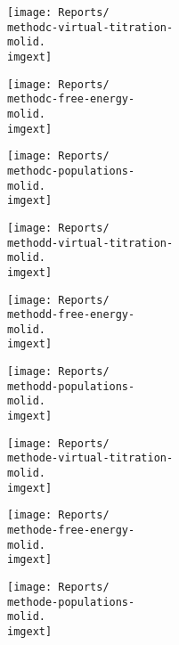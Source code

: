 \documentclass[9pt]{standalone}
\begin{document}
\begin{minipage}[s]{\textwidth}\centering
{\textbf \methodc}
\end{minipage}

\noindent
\begin{minipage}[s]{0.33\textwidth}\centering
\texttt{[image: Reports/\\methodc-virtual-titration-\\molid.\\imgext]}
\end{minipage}
\begin{minipage}[s]{0.33\textwidth}
\texttt{[image: Reports/\\methodc-free-energy-\\molid.\\imgext]}
\end{minipage}
\begin{minipage}[s]{0.33\textwidth}
\texttt{[image: Reports/\\methodc-populations-\\molid.\\imgext]}
\end{minipage}

\begin{minipage}[s]{\textwidth}\centering
{\textbf \methodd}
\end{minipage}

\noindent
\begin{minipage}[s]{0.33\textwidth}\centering
\texttt{[image: Reports/\\methodd-virtual-titration-\\molid.\\imgext]}
\end{minipage}
\begin{minipage}[s]{0.33\textwidth}
\texttt{[image: Reports/\\methodd-free-energy-\\molid.\\imgext]}
\end{minipage}
\begin{minipage}[s]{0.33\textwidth}
\texttt{[image: Reports/\\methodd-populations-\\molid.\\imgext]}
\end{minipage}

\begin{minipage}[s]{\textwidth}\centering
{\textbf \methode}
\end{minipage}

\noindent
\begin{minipage}[s]{0.33\textwidth}\centering
\texttt{[image: Reports/\\methode-virtual-titration-\\molid.\\imgext]}
\end{minipage}
\begin{minipage}[s]{0.33\textwidth}
\texttt{[image: Reports/\\methode-free-energy-\\molid.\\imgext]}
\end{minipage}
\begin{minipage}[s]{0.33\textwidth}
\texttt{[image: Reports/\\methode-populations-\\molid.\\imgext]}
\end{minipage}
\end{document}
